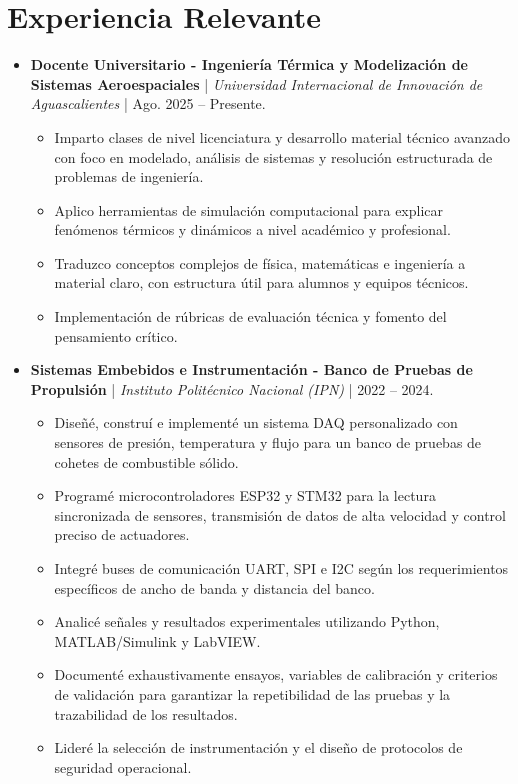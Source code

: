 \documentclass[10pt,letterpaper]{article}
\begin{document}
\section*{Experiencia Relevante}
\begin{itemize}[leftmargin=*, itemsep=0pt]
    \item \textbf{Docente Universitario - Ingeniería Térmica y Modelización de Sistemas Aeroespaciales} | \textit{Universidad Internacional de Innovación de Aguascalientes} | Ago. 2025 -- Presente.
    \begin{itemize}[itemsep=0pt]
        \item Imparto clases de nivel licenciatura y desarrollo material técnico avanzado con foco en modelado, análisis de sistemas y resolución estructurada de problemas de ingeniería.
        \item Aplico herramientas de simulación computacional para explicar fenómenos térmicos y dinámicos a nivel académico y profesional.
        \item Traduzco conceptos complejos de física, matemáticas e ingeniería a material claro, con estructura útil para alumnos y equipos técnicos.
        \item Implementación de rúbricas de evaluación técnica y fomento del pensamiento crítico.
    \end{itemize}
    \item \textbf{Sistemas Embebidos e Instrumentación - Banco de Pruebas de Propulsión} | \textit{Instituto Politécnico Nacional (IPN)} | 2022 -- 2024.
    \begin{itemize}[itemsep=0pt]
        \item Diseñé, construí e implementé un sistema DAQ personalizado con sensores de presión, temperatura y flujo para un banco de pruebas de cohetes de combustible sólido.
        \item Programé microcontroladores ESP32 y STM32 para la lectura sincronizada de sensores, transmisión de datos de alta velocidad y control preciso de actuadores.
        \item Integré buses de comunicación UART, SPI e I2C según los requerimientos específicos de ancho de banda y distancia del banco.
        \item Analicé señales y resultados experimentales utilizando Python, MATLAB/Simulink y LabVIEW.
        \item Documenté exhaustivamente ensayos, variables de calibración y criterios de validación para garantizar la repetibilidad de las pruebas y la trazabilidad de los resultados.
        \item Lideré la selección de instrumentación y el diseño de protocolos de seguridad operacional.
    \end{itemize}
\end{itemize}
\end{document}
